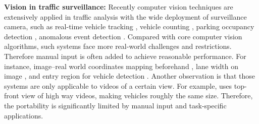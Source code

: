 \textbf{Vision in traffic surveillance:}
Recently computer vision techniques are extensively applied in traffic analysis with the wide deployment of surveillance camera, such as real-time vehicle tracking \cite{coifman1998real}, vehicle counting \cite{wang2015real}, 
parking occupancy detection \cite{bulan2013video}, anomalous event detection \cite{jiang2011anomalous}. %
Compared with core computer vision algorithms, such systems face more real-world challenges and restrictions. Therefore manual input is often added to achieve reasonable performance. For instance,  image--real world coordinates mapping beforehand \cite{coifman1998real}, lane width on image \cite{chen2011real}, and entry region for vehicle detection \cite{chen2011real}. %
Another observation is that those systems are only applicable to videos of a certain view.  
For example, \cite{coifman1998real}
uses top-front view of high way videos, making vehicles roughly the same size. 
Therefore, the portability is significantly limited by manual input and task-specific applications.


